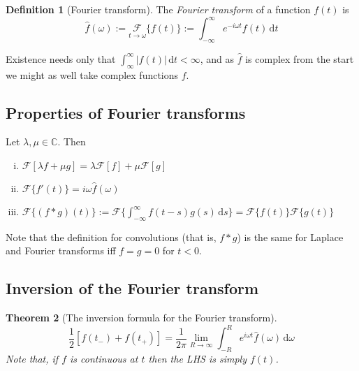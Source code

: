 \documentclass[10pt,fleqn]{article}
\newcommand{\diff}{\,\mathrm{d}}
\newcommand{\comps}{\mathbb{C}}
\theoremstyle{definition} \newtheorem{defn}{Definition}[section]
\theoremstyle{plain}      \newtheorem{thm}[defn]{Theorem}
\theoremstyle{plain}      \newtheorem{lem}[defn]{Lemma}
\theoremstyle{definition} \newtheorem{prop}[defn]{Proposition}
\theoremstyle{definition} \newtheorem{cor}[defn]{Corollary}
\theoremstyle{definition} \newtheorem{ex}[defn]{Example}
\theoremstyle{definition} \newtheorem{rem}[defn]{Remark}
\begin{document}
{\begin{defn}[Fourier transform]
    The \emph{Fourier transform} of a function $f(t)$ is
    \begin{equation}
        \hat{f}(\omega):=
        \underset{t\to\omega}{\mathcal{F}}\{f(t)\}:=
        \int_{-\infty}^{\infty}e^{-i\omega t}f(t)\diff t
    \end{equation}    
\end{defn}

Existence needs only that $\int_{\infty}^{\infty}|f(t)|\diff t<\infty$, and as $\hat{f}$ is complex from the start we might as well take complex functions $f$.

\subsection{Properties of Fourier transforms}

Let $\lambda,\mu\in\comps$.
Then
\begin{enumerate}[(i)]
    \item $\mathcal{F}[\lambda f+\mu g]=\lambda\mathcal{F}[f]+\mu\mathcal{F}[g]$
    \item $\mathcal{F}\{f'(t)\}=i\omega\hat{f}(\omega)$
    \item $\mathcal{F}\{(f*g)(t)\}:=\mathcal{F}\{\int_{-\infty}^{\infty}f(t-s)g(s)\diff s\}=\mathcal{F}\{f(t)\}\mathcal{F}\{g(t)\}$
\end{enumerate}

Note that the definition for convolutions (that is, $f*g$) is the same for Laplace and Fourier transforms iff $f=g=0$ for $t<0$.


\subsection{Inversion of the Fourier transform}

\begin{thm}[The inversion formula for the Fourier transform]
    \begin{equation}\label{fourier-inv}
        \frac{1}{2}[f(t_-)+f(t_+)]=
        \frac{1}{2\pi}\lim_{R\to\infty}\int_{-R}^R e^{i\omega t}\hat{f}(\omega)\diff\omega
    \end{equation}
    Note that, if $f$ is continuous at $t$ then the LHS is simply $f(t)$.
\end{thm}

}
\end{document}
